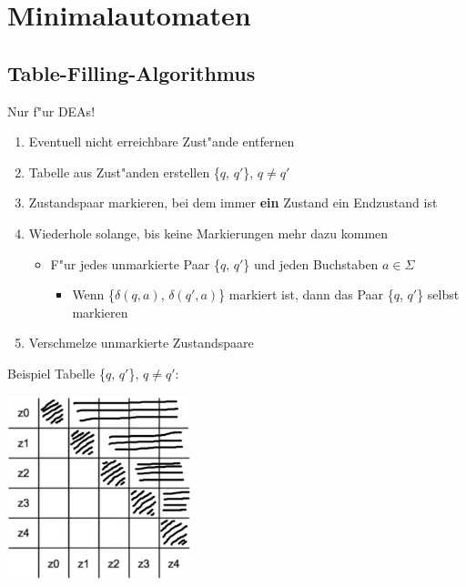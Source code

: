 \documentclass[11pt, a4paper]{scrartcl}
\begin{document}
\newpage


\section{Minimalautomaten}

\subsection{Table-Filling-Algorithmus}

Nur f"ur DEAs!

\begin{enumerate}
    \item Eventuell nicht erreichbare Zust"ande entfernen
    \item Tabelle aus Zust"anden erstellen \{$q$, $q'$\}, $q \neq q'$
    \item Zustandspaar markieren, bei dem immer \textbf{ein} Zustand ein Endzustand ist
    \item Wiederhole solange, bis keine Markierungen mehr dazu kommen
    \begin{itemize}
            \item F"ur jedes unmarkierte Paar \{$q$, $q'$\} und jeden Buchstaben $a \in \Sigma$
            \begin{itemize}
                \item Wenn \{$\delta(q, a)$, $\delta(q', a)$\} markiert ist, dann das Paar \{$q$, $q'$\} selbst markieren
            \end{itemize}
    \end{itemize}
    \item Verschmelze unmarkierte Zustandspaare
\end{enumerate}

\vspace{3em}

Beispiel Tabelle \{$q$, $q'$\}, $q \neq q'$:

\vspace{0.5em}

\includegraphics[width=0.4\textwidth]{Minimal-00.png}
\end{document}
